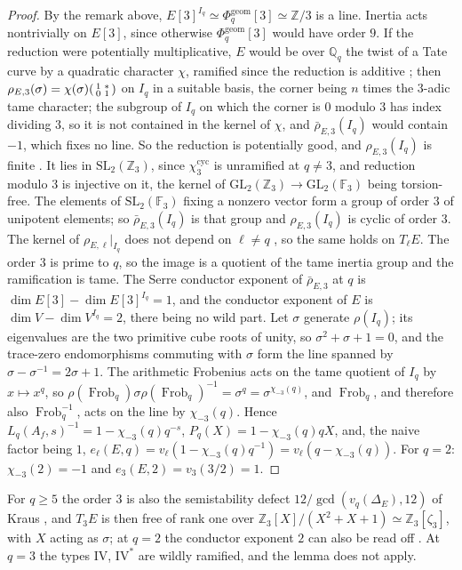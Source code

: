 \documentclass[11pt]{amsart}
\theoremstyle{definition}
\newcommand{\Q}{\mathbb{Q}}
\newcommand{\Z}{\mathbb{Z}}
\newcommand{\F}{\mathbb{F}}
\newcommand{\Phig}{\Phi^{\mathrm{geom}}}
\newcommand{\Frob}{\operatorname{Frob}}
\newcommand{\cyc}{\mathrm{cyc}}
\newcommand{\SL}{\mathrm{SL}}
\newcommand{\GL}{\mathrm{GL}}
\begin{document}
\begin{proof}
By the remark above, $E[3]^{I_q}\simeq\Phig_q[3]\simeq\Z/3$ is a line. Inertia acts nontrivially on $E[3]$, since otherwise $\Phig_q[3]$ would have order $9$. If the reduction were potentially multiplicative, $E$ would be over $\Q_q$ the twist of a Tate curve by a quadratic character $\chi$, ramified since the reduction is additive \cite[V.5]{SilvermanATAEC}; then $\rho_{E,3}(\sigma)=\chi(\sigma)\begin{psmallmatrix}1&*\\0&1\end{psmallmatrix}$ on $I_q$ in a suitable basis, the corner being $n$ times the $3$-adic tame character; the subgroup of $I_q$ on which the corner is $0$ modulo $3$ has index dividing $3$, so it is not contained in the kernel of $\chi$, and $\bar\rho_{E,3}(I_q)$ would contain $-1$, which fixes no line. So the reduction is potentially good, and $\rho_{E,3}(I_q)$ is finite \cite[\S2]{SerreTate68}. It lies in $\SL_2(\Z_3)$, since $\chi_3^{\cyc}$ is unramified at $q\ne3$, and reduction modulo $3$ is injective on it, the kernel of $\GL_2(\Z_3)\to\GL_2(\F_3)$ being torsion-free. The elements of $\SL_2(\F_3)$ fixing a nonzero vector form a group of order $3$ of unipotent elements; so $\bar\rho_{E,3}(I_q)$ is that group and $\rho_{E,3}(I_q)$ is cyclic of order $3$. The kernel of $\rho_{E,\ell}|_{I_q}$ does not depend on $\ell\ne q$ \cite[\S2]{SerreTate68}, so the same holds on $T_\ell E$. The order $3$ is prime to $q$, so the image is a quotient of the tame inertia group and the ramification is tame. The Serre conductor exponent of $\bar\rho_{E,3}$ at $q$ is $\dim E[3]-\dim E[3]^{I_q}=1$, and the conductor exponent of $E$ is $\dim V-\dim V^{I_q}=2$, there being no wild part. Let $\sigma$ generate $\rho(I_q)$; its eigenvalues are the two primitive cube roots of unity, so $\sigma^2+\sigma+1=0$, and the trace-zero endomorphisms commuting with $\sigma$ form the line spanned by $\sigma-\sigma^{-1}=2\sigma+1$. The arithmetic Frobenius acts on the tame quotient of $I_q$ by $x\mapsto x^q$, so $\rho(\Frob_q)\sigma\rho(\Frob_q)^{-1}=\sigma^q=\sigma^{\chi_{-3}(q)}$, and $\Frob_q$, and therefore also $\Frob_q^{-1}$, acts on the line by $\chi_{-3}(q)$. Hence $L_q(A_f,s)^{-1}=1-\chi_{-3}(q)q^{-s}$, $P_q(X)=1-\chi_{-3}(q)qX$, and, the naive factor being $1$, $e_\ell(E,q)=v_\ell(1-\chi_{-3}(q)q^{-1})=v_\ell(q-\chi_{-3}(q))$. For $q=2$: $\chi_{-3}(2)=-1$ and $e_3(E,2)=v_3(3/2)=1$.
\end{proof}

For $q\ge5$ the order $3$ is also the semistability defect $12/\gcd(v_q(\Delta_E),12)$ of Kraus \cite{Kraus90}, and $T_3E$ is then free of rank one over $\Z_3[X]/(X^2+X+1)\simeq\Z_3[\zeta_3]$, with $X$ acting as $\sigma$; at $q=2$ the conductor exponent $2$ can also be read off \cite{DokDok15}. At $q=3$ the types $\mathrm{IV}$, $\mathrm{IV}^*$ are wildly ramified, and the lemma does not apply.
\end{document}
